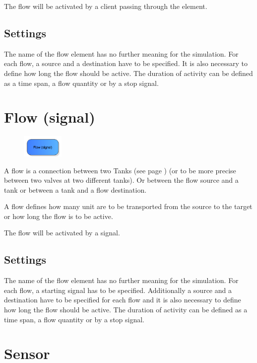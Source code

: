 The flow will be activated by a client passing through the element.

\subsection*{Settings}

The name of the flow element has no further meaning for the simulation.
For each flow, a source and a destination have to be specified.
It is also necessary to define how long the flow should be active.
The duration of activity can be defined as a time span, a flow quantity or by a stop signal.


\section{Flow (signal)}
\label{ref:ModelElementTankFlowBySignal}

\begin{figure}
\vspace{-22pt}
\includegraphics[width=2cm]{imageModelElementTankFlowBySignal.png}
\vspace{-22pt}
\end{figure}

A flow is a connection between two Tanks (see page \pageref{ref:ModelElementTank}) 
(or to be more precise between two valves at two different tanks).
Or between the flow source and a tank or between a tank and a flow destination.

A flow defines how many unit are to be transported from the source to the target
or how long the flow is to be active.

The flow will be activated by a signal.

\subsection*{Settings}

The name of the flow element has no further meaning for the simulation.
For each flow, a starting signal has to be specified.
Additionally a source and a destination have to be specified for each flow
and it is also necessary to define how long the flow should be active.
The duration of activity can be defined as a time span, a flow quantity or by a stop signal.


\section{Sensor}
\label{ref:ModelElementTankSensor}

